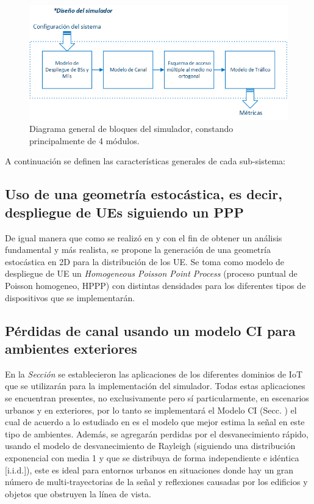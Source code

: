 \begin{figure}[th]
    \centering
    \includegraphics[scale=1]{Figures/Diagrama general de bloques del simulador}
    \decoRule
    \caption[Diagrama general de bloques del simulador, constando principalmente de 4 módulos.]{Diagrama general de bloques del simulador, constando principalmente de 4 módulos.}
    \label{fig:DiagramaGral}
\end{figure}

A continuación se definen las características generales de cada sub-sistema:\newline

\subsection{Uso de una geometría estocástica, es decir, despliegue de UEs siguiendo un PPP}

De igual manera que como se realizó en \parencite{Kouzayha2018} y \parencite{Zhang2017} con el fin de obtener un análisis fundamental y más realista, se propone la generación de una geometría estocástica en 2D para la distribución de los UE. Se toma como modelo de despliegue de UE un \textit{ Homogeneous Poisson Point Process }(proceso puntual de Poisson homogeneo, HPPP) con distintas densidades para los diferentes tipos de dispositivos que se implementarán.\newline

\subsection{Pérdidas de canal usando un modelo CI para ambientes exteriores}

En la \textit{Sección } se establecieron las aplicaciones de los diferentes dominios de IoT que se utilizarán para la implementación del simulador. Todas estas aplicaciones se encuentran presentes, no exclusivamente pero sí particularmente, en escenarios urbanos y en exteriores, por lo tanto se implementará el Modelo CI (Secc. ) el cual de acuerdo a lo estudiado en \parencite{Sun2016} es el modelo que mejor estima la señal en este tipo de ambientes. Además, se agregarán perdidas por el desvanecimiento rápido, usando el modelo de desvanecimiento de Rayleigh (siguiendo una distribución exponencial con media 1 y que se distribuya de forma independiente e idéntica [i.i.d.]), este es ideal para entornos urbanos en situaciones donde hay un gran número de multi-trayectorias de la señal y reflexiones causadas por los edificios y objetos que obstruyen la línea de vista. \newline

